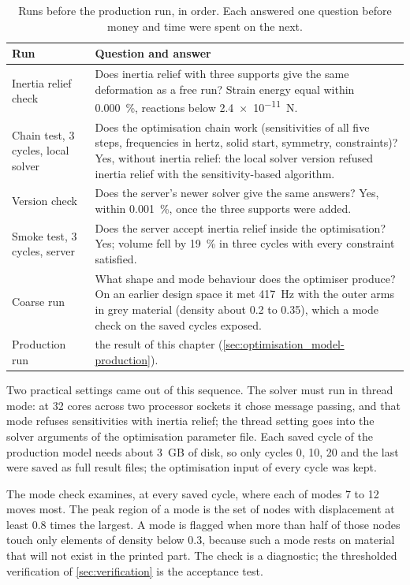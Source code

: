 \begin{table}[htbp]
\centering\small
\caption{Runs before the production run, in order. Each answered one question before money and time were spent on the next.}\label{tab:optimisation_model-sequence}
\begin{tabularx}{\linewidth}{@{}lX@{}}
\toprule
Run & Question and answer\\
\midrule
Inertia relief check & Does inertia relief with three supports give the same deformation as a free run? Strain energy equal within \SI{0.000}{\percent}, reactions below \SI{2.4e-11}{N}.\\
Chain test, 3 cycles, local solver & Does the optimisation chain work (sensitivities of all five steps, frequencies in hertz, solid start, symmetry, constraints)? Yes, without inertia relief: the local solver version refused inertia relief with the sensitivity-based algorithm.\\
Version check & Does the server's newer solver give the same answers? Yes, within \SI{0.001}{\percent}, once the three supports were added.\\
Smoke test, 3 cycles, server & Does the server accept inertia relief inside the optimisation? Yes; volume fell by \SI{19}{\percent} in three cycles with every constraint satisfied.\\
Coarse run & What shape and mode behaviour does the optimiser produce? On an earlier design space it met \SI{417}{Hz} with the outer arms in grey material (density about 0.2 to 0.35), which a mode check on the saved cycles exposed.\\
Production run & the result of this chapter (\cref{sec:optimisation_model-production}).\\
\bottomrule
\end{tabularx}
\end{table}

Two practical settings came out of this sequence. The solver must run in thread mode: at 32 cores across two processor sockets it chose message passing, and that mode refuses sensitivities with inertia relief; the thread setting goes into the solver arguments of the optimisation parameter file. Each saved cycle of the production model needs about \SI{3}{GB} of disk, so only cycles 0, 10, 20 and the last were saved as full result files; the optimisation input of every cycle was kept.

The mode check examines, at every saved cycle, where each of modes 7 to 12 moves most. The peak region of a mode is the set of nodes with displacement at least 0.8 times the largest. A mode is flagged when more than half of those nodes touch only elements of density below 0.3, because such a mode rests on material that will not exist in the printed part. The check is a diagnostic; the thresholded verification of \cref{sec:verification} is the acceptance test.

